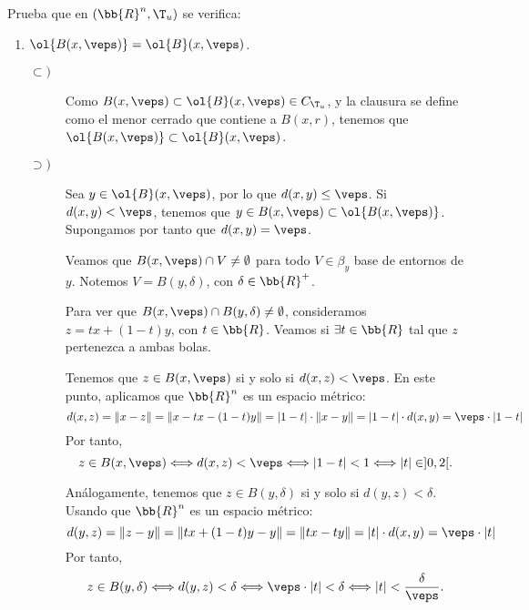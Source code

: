 \begin{ejercicio}
    Prueba que en $(\bb{R}^n, \T_u)$ se verifica:
    \begin{enumerate}[label=\alph*)]
        \item $\ol{B(x,\veps)} = \ol{B}(x,\veps)$.

        \begin{description}
            \item[$\subset)$] 
            Como $B(x,\veps)\subset \ol{B}(x,\veps)\in C_{\T_u}$, y la clausura se define como el menor cerrado que contiene a $B(x,r)$, tenemos que $\ol{B(x,\veps)} \subset \ol{B}(x,\veps)$.
            
            \item[$\supset)$] Sea $y\in \ol{B}(x,\veps)$, por lo que $d(x,y)\leq \veps$. Si $d(x,y)<\veps$, tenemos que $y\in B(x,\veps)\subset \ol{B(x,\veps)}$. Supongamos por tanto que $d(x,y)=\veps$.

            Veamos que $B(x,\veps)\cap V\neq \emptyset$ para todo $V\in \beta_y$ base de entornos de $y$. Notemos $V=B(y,\delta)$, con $\delta\in \bb{R}^+$.

            Para ver que $B(x,\veps)\cap B(y,\delta)\neq \emptyset$, consideramos $z=tx+(1-t)y$, con $t\in \bb{R}$. Veamos si $\exists t\in \bb{R}$ tal que $z$ pertenezca a ambas bolas.

            Tenemos que $z\in B(x,\veps)$ si y solo si $d(x,z)<\veps$. En este punto, aplicamos que $\bb{R}^n$ es un espacio métrico:
            \begin{equation*}
                d(x,z)=\|x-z\|=\|x-tx-(1-t)y\| = |1-t|\cdot \|x-y\|=|1-t|\cdot d(x,y)=\veps\cdot |1-t|
            \end{equation*}
            Por tanto, 
            \begin{equation*}
                z\in B(x,\veps) \Longleftrightarrow d(x,z)<\veps
                \Longleftrightarrow |1-t|<1 \Longleftrightarrow |t|\in ]0,2[.
            \end{equation*}

            Análogamente, tenemos que $z\in B(y,\delta)$ si y solo si $d(y,z)<\delta$. Usando que $\bb{R}^n$ es un espacio métrico:
            \begin{equation*}
                d(y,z)=\|z-y\|=\|tx+(1-t)y-y\|=\|tx-ty\| = |t|\cdot d(x,y)=\veps\cdot |t|
            \end{equation*}
            Por tanto, 
            \begin{equation*}
                z\in B(y,\delta) \Longleftrightarrow d(y,z)<\delta
                \Longleftrightarrow \veps\cdot |t|<\delta \Longleftrightarrow |t|<\frac{\delta}{\veps}.
            \end{equation*}


\end{description}
\end{enumerate}
\end{ejercicio}
